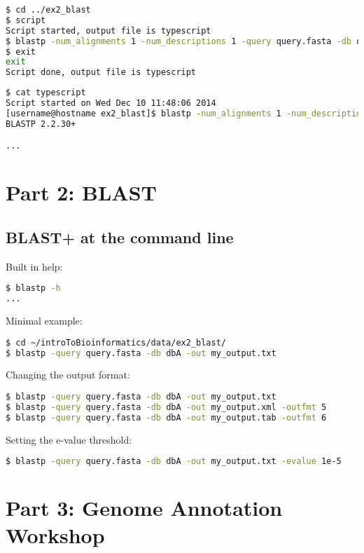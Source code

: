 \documentclass[a4paper]{article}
\begin{document}
\begin{lstlisting}[language=bash]
$ cd ../ex2_blast
$ script
Script started, output file is typescript
$ blastp -num_alignments 1 -num_descriptions 1 -query query.fasta -db dbA
$ exit
exit
Script done, output file is typescript
\end{lstlisting}

\begin{lstlisting}[language=bash]
$ cat typescript
Script started on Wed Dec 10 11:48:06 2014
[username@hostname ex2_blast]$ blastp -num_alignments 1 -num_descriptions 1 -query query.fasta -db dbA
BLASTP 2.2.30+

...
\end{lstlisting}

\section*{Part 2: BLAST}

\subsection*{BLAST+ at the command line}

Built in help:

\begin{lstlisting}[language=bash]
$ blastp -h
...
\end{lstlisting}

\pagebreak

Minimal example:

\begin{lstlisting}[language=bash]
$ cd ~/introToBioinformatics/data/ex2_blast/
$ blastp -query query.fasta -db dbA -out my_output.txt
\end{lstlisting}

Changing the output format:

\begin{lstlisting}[language=bash]
$ blastp -query query.fasta -db dbA -out my_output.txt
$ blastp -query query.fasta -db dbA -out my_output.xml -outfmt 5
$ blastp -query query.fasta -db dbA -out my_output.tab -outfmt 6
\end{lstlisting}

Setting the e-value threshold:

\begin{lstlisting}[language=bash]
$ blastp -query query.fasta -db dbA -out my_output.txt -evalue 1e-5
\end{lstlisting}

\section*{Part 3: Genome Annotation Workshop}
\end{document}
